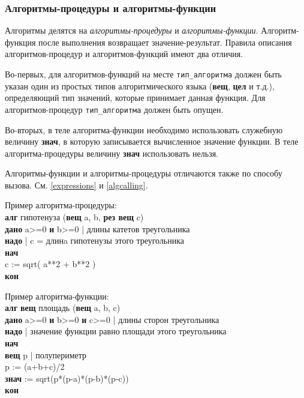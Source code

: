 \subsubsection{Алгоритмы-процедуры и алгоритмы-функции}

Алгоритмы делятся на \emph{алгоритмы-процедуры} и \emph{алгоритмы-функции}. Алгоритм-функция после выполнения возвращает зна\-че\-ние-ре\-зуль\-тат. Правила описания ал\-го\-рит\-мов-про\-це\-дур и алгоритмов-функций имеют два отличия.

Во-первых, для алгоритмов-функций на месте \texttt{тип\_алгоритма} должен быть указан один из простых типов алгоритмического языка (\textbf{вещ}, \textbf{цел} и т.д.), определяющий тип значений, которые принимает данная функция. Для алгоритмов-процедур \texttt{тип\_алгоритма} должен быть опущен.

Во-вторых, в теле алгоритма-функции необходимо использовать служебную величину \textbf{знач}, в которую записывается вычисленное значение функции. В теле алгоритма-процедуры величину \textbf{знач} использовать нельзя.

Алгоритмы-функции и алгоритмы-процедуры отличаются также по способу вызова. См. \ref{expressions} и \ref{algcalling}.

Пример алгоритма-процедуры:
{\sffamily~\\
\textbf{алг} гипотенуза (\textbf{вещ} a, b, \textbf{рез вещ} c)\\
\textbf{дано} a>=0 \textbf{и} b>=0 | длины катетов треугольника\\
\textbf{надо} | c = длинa гипотенузы этого треугольника\\
\textbf{нач}\\
\otstup c := sqrt( a**2 + b**2 )\\
\textbf{кон} 
}

Пример алгоритма-функции:
{\sffamily~\\
\textbf{алг} \textbf{вещ} площадь (\textbf{вещ} a, b, c)\\
\textbf{дано} a>=0 \textbf{и} b>=0 \textbf{и} c>=0 | длины сторон треугольника\\
\textbf{надо} | значение функции равно площади этого треугольника\\
\textbf{нач}\\
\otstup \textbf{вещ} p | полупериметр\\
\otstup p := (a+b+c)/2\\
\otstup \textbf{знач} := sqrt(p*(p-a)*(p-b)*(p-c))\\
\textbf{кон}
}


